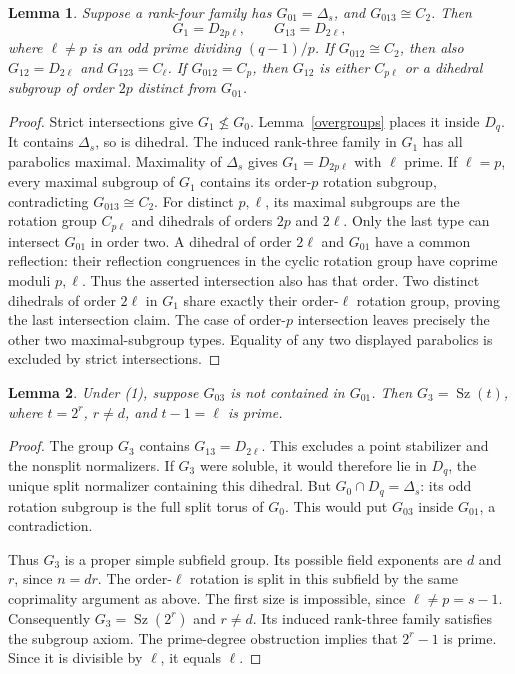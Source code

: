 \documentclass[11pt,a4paper]{article}
\newtheorem{lemma}{Lemma}\newtheorem{theorem}[lemma]{Theorem}
\newcommand{\Sz}{\operatorname{Sz}}\newcommand{\gen}[1]{\langle#1\rangle}
\begin{document}
\begin{lemma}\label{dihedral}
Suppose a rank-four family has $G_{01}=\Delta_s$, and
$G_{013}\cong C_2$. Then
\[
 G_1=D_{2p\ell},\qquad G_{13}=D_{2\ell},
                                                        \tag{1}
\]
where $\ell\ne p$ is an odd prime dividing $(q-1)/p$.
If $G_{012}\cong C_2$, then also
$G_{12}=D_{2\ell}$ and $G_{123}=C_\ell$.
If $G_{012}=C_p$, then $G_{12}$ is either $C_{p\ell}$ or a
dihedral subgroup of order $2p$ distinct from $G_{01}$.
\end{lemma}
\begin{proof}
Strict intersections give $G_1\nleq G_0$. Lemma~\ref{overgroups}
places it inside $D_q$. It contains $\Delta_s$, so is dihedral.
The induced rank-three family in $G_1$ has all parabolics maximal.
Maximality of $\Delta_s$ gives $G_1=D_{2p\ell}$ with $\ell$ prime.
If $\ell=p$, every maximal subgroup of $G_1$ contains its order-$p$
rotation subgroup, contradicting $G_{013}\cong C_2$.
For distinct $p,\ell$, its maximal subgroups are the rotation group
$C_{p\ell}$ and dihedrals of orders $2p$ and $2\ell$.
Only the last type can intersect $G_{01}$ in order two. A dihedral
of order $2\ell$ and $G_{01}$ have a common reflection: their
reflection congruences in the cyclic rotation group have coprime
moduli $p,\ell$. Thus the asserted intersection also has that order.
Two distinct dihedrals of order $2\ell$ in $G_1$ share exactly their
order-$\ell$ rotation group, proving the last intersection claim.
The case of order-$p$ intersection leaves precisely the other two
maximal-subgroup types. Equality of any two displayed parabolics is
excluded by strict intersections.
\end{proof}

\begin{lemma}\label{other}
Under (1), suppose $G_{03}$ is not contained in $G_{01}$. Then
$G_3=\Sz(t)$, where $t=2^r$, $r\ne d$, and $t-1=\ell$ is prime.
\end{lemma}
\begin{proof}
The group $G_3$ contains $G_{13}=D_{2\ell}$. This excludes a
point stabilizer and the nonsplit normalizers. If $G_3$ were soluble,
it would therefore lie in $D_q$, the unique split normalizer containing
this dihedral. But $G_0\cap D_q=\Delta_s$: its odd rotation subgroup
is the full split torus of $G_0$. This would put $G_{03}$ inside
$G_{01}$, a contradiction.

Thus $G_3$ is a proper simple subfield group. Its possible field
exponents are $d$ and $r$, since $n=dr$. The order-$\ell$ rotation
is split in this subfield by the same coprimality argument as above.
The first size is impossible, since $\ell\ne p=s-1$.
Consequently $G_3=\Sz(2^r)$ and $r\ne d$.
Its induced rank-three family satisfies the subgroup axiom. The
prime-degree obstruction implies that $2^r-1$ is prime.
Since it is divisible by $\ell$, it equals $\ell$.
\end{proof}
\end{document}
